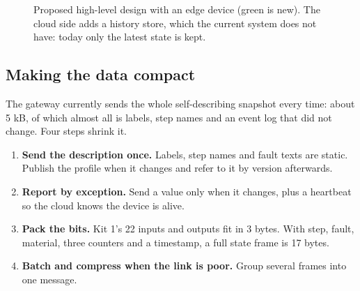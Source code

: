 \documentclass[a4paper,10.5pt]{article}
\begin{document}
\begin{figure}[H]
\caption{Proposed high-level design with an edge device (green is new). The cloud side adds a history store, which the current system does not have: today only the latest state is kept.}
\end{figure}

\subsection{Making the data compact}
The gateway currently sends the whole self-describing snapshot every time: about 5 kB, of which almost all
is labels, step names and an event log that did not change. Four steps shrink it.
\begin{enumerate}
  \item \textbf{Send the description once.} Labels, step names and fault texts are static. Publish the profile when it changes and refer to it by version afterwards.
  \item \textbf{Report by exception.} Send a value only when it changes, plus a heartbeat so the cloud knows the device is alive.
  \item \textbf{Pack the bits.} Kit 1's 22 inputs and outputs fit in 3 bytes. With step, fault, material, three counters and a timestamp, a full state frame is 17 bytes.
  \item \textbf{Batch and compress when the link is poor.} Group several frames into one message.
\end{enumerate}
\end{document}
